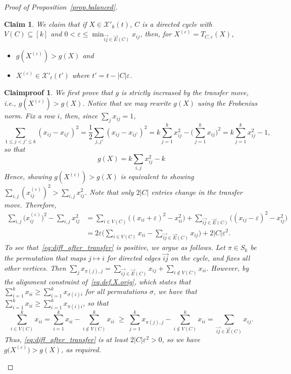 \documentclass[10pt,a4paper]{amsart}
\newtheorem{claim}{Claim}
\newtheorem{claimproof}{Claimproof}
\newcommand{\cX}{\mathcal{X}}
\newcommand{\eps}{\varepsilon}
\begin{document}
\begin{proof}[Proof of Proposition~\ref{prop.balanced}]
\begin{claim}\label{clm.ginc_stillvalid}
    We \emph{claim} that if $X\in \cX'_k(t)$, $C$ is a directed cycle with $V(C)\subseteq [k]$ and $0< \eps \leq \min_{\vec{ij}\in \vec{E}(C)} x_{ij}$, then, for $X^{(\eps)}=T_{C,\eps}(X)$,
    \begin{itemize}
        \item $g(X^{(\eps)})>g(X)$ and
        \item $X^{(\eps)}\in \cX'_t(t')$ where $t'=t-|C|\eps$.
    \end{itemize}
\end{claim}
\begin{claimproof}
We first prove that $g$ is strictly increased by the transfer move, i.e., $g(X^{(\eps)})>g(X)$. Notice that we may rewrite $g(X)$ using the Frobenius norm. Fix a row $i$, then, since $\sum_j x_{ij}=1$,
\[
\sum_{1\le j<j'\le k} (x_{ij}-x_{ij'})^2
=\frac12\sum_{j,j'}(x_{ij}-x_{ij'})^2
= k\sum_{j=1}^k x_{ij}^2 -\Big(\sum_{j=1}^k x_{ij}\Big)^2
= k\sum_{j=1}^k x_{ij}^2 - 1,
\]
so that
\begin{equation}
\label{eq:g_frob_bal}
g(X)
= k\sum_{i,j} x_{ij}^2 -k 
\end{equation}
Hence, showing $g(X^{(\eps)})>g(X)$ is equivalent to showing $\sum_{i,j}(x^{(\eps)}_{ij})^2> \sum_{i,j}x_{ij}^2$.
Note that only $2|C|$ entries change in the transfer move. Therefore,
\begin{align}
\nonumber
% 
\sum_{i,j} \big(x^{(\varepsilon)}_{ij}\big)^2 - \sum_{i,j} x_{ij}^2 %
&= \sum_{i \in V(C)} \Big((x_{ii}+\varepsilon)^2-x_{ii}^2\Big)
   +\sum_{\vec{ij}\in \vec{E}(C)} \Big((x_{ij}-\varepsilon)^2-x_{ij}^2\Big)\\
&= 2\varepsilon\Big(\sum_{i \in V(C)} x_{ii} - \sum_{\vec{ij}\in \vec{E}(C)} x_{ij}\Big) + 2|C|\varepsilon^2.\label{eq:diff_after_transfer}
\end{align}
To see that~\eqref{eq:diff_after_transfer} is positive, we argue as follows. Let $\pi\in S_k$ be the permutation that maps $j\mapsto i$ for directed edges $\vec{ij}$ on the cycle, and fixes all other vertices.
Then $\sum_j x_{\pi(j),j}=\sum_{\vec{ij}\in \vec{E}(C)}  x_{ij} + \sum_{i\notin V(C)}x_{ii}$.
However, by the alignment constraint of~\eqref{eq.def.X.orig}, which states that $\sum_{i=1}^k x_{ii} \geq \sum_{i=1}^k x_{\sigma(i)i}$ for all permutations $\sigma$, we have that
$\sum_{i=1}^k x_{ii} \geq \sum_{i=1}^k x_{\pi(i)i}$, so that
\[
\sum_{i\in V(C)}^k x_{ii} = \sum_{i=1}^k x_{ii} - \sum_{i\notin V(C)}^k x_{ii}  \;\ge\; \sum_{j=1}^k x_{\pi(j),j} - \sum_{i\notin V(C)}^k x_{ii} = \sum_{\vec{ij}\in \vec{E}(C)}  x_{ij}.
\]
Thus, \eqref{eq:diff_after_transfer} is at least $2|C|\eps^2>0$, so we have $g\big(X^{(\varepsilon)}\big) > g(X)$, as required.
    





\end{claimproof}
\end{proof}
\end{document}
